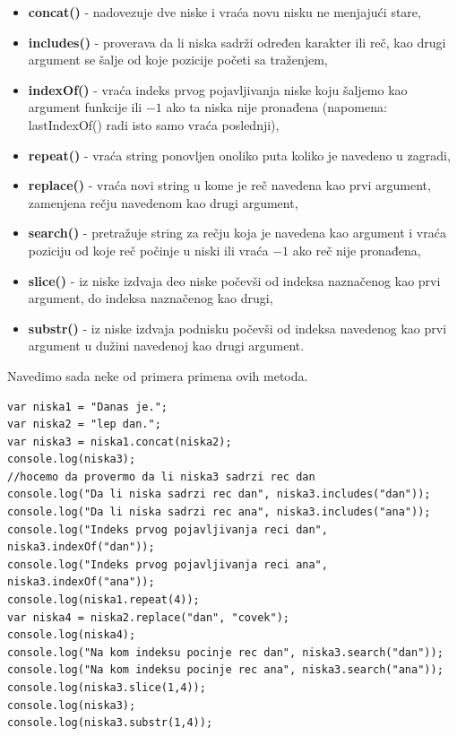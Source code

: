 \documentclass[a4paper]{article}
\begin{document}
\begin{itemize}
    \item \textbf{concat()} - nadovezuje dve niske i vraća novu nisku ne menjajući stare,
    \item \textbf{includes()} - proverava da li niska sadrži određen karakter ili reč, kao drugi argument se šalje od koje pozicije početi sa traženjem,  
    \item \textbf{indexOf()} - vraća indeks prvog pojavljivanja niske koju šaljemo kao argument funkcije ili $-1$ ako ta niska nije pronađena (napomena: lastIndexOf() radi isto samo vraća poslednji), 
    \item \textbf{repeat()} - vraća string ponovljen onoliko puta koliko je navedeno u zagradi, 
    \item \textbf{replace()} - vraća novi string u kome je reč navedena kao prvi argument, zamenjena rečju navedenom kao drugi argument, 
    \item \textbf{search()} - pretražuje string za rečju koja je navedena kao argument i vraća poziciju od koje reč počinje u niski ili vraća $-1$ ako reč nije pronađena,  
    \item \textbf{slice()} - iz niske izdvaja deo niske počevši od indeksa naznačenog kao prvi argument, do indeksa naznačenog kao drugi, 
    \item \textbf{substr()} - iz niske izdvaja podnisku počevši od indeksa navedenog kao prvi argument u dužini navedenoj kao drugi argument.
\end{itemize}

Navedimo sada neke od primera primena ovih metoda.
\begin{lstlisting}[backgroundcolor = \color{lightgray}]
var niska1 = "Danas je.";
var niska2 = "lep dan.";
var niska3 = niska1.concat(niska2);
console.log(niska3);
//hocemo da provermo da li niska3 sadrzi rec dan
console.log("Da li niska sadrzi rec dan", niska3.includes("dan"));
console.log("Da li niska sadrzi rec ana", niska3.includes("ana"));
console.log("Indeks prvog pojavljivanja reci dan", niska3.indexOf("dan"));
console.log("Indeks prvog pojavljivanja reci ana", niska3.indexOf("ana"));
console.log(niska1.repeat(4));
var niska4 = niska2.replace("dan", "covek");
console.log(niska4);
console.log("Na kom indeksu pocinje rec dan", niska3.search("dan"));
console.log("Na kom indeksu pocinje rec ana", niska3.search("ana"));
console.log(niska3.slice(1,4));
console.log(niska3);
console.log(niska3.substr(1,4));    
\end{lstlisting}
\end{document}
